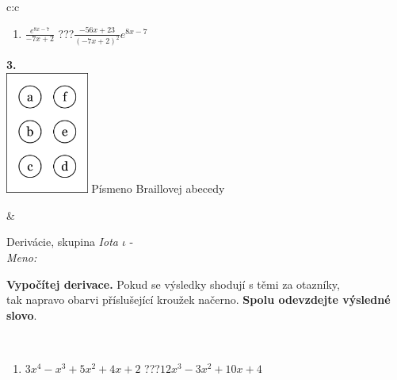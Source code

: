 \documentclass[10pt]{report}
\begin{document}
\begin{tabular}{c:c}
\begin{minipage}[c][104.5mm][t]{0.5\linewidth}
\begin{center}
\begin{minipage}{0.79\linewidth}
\begin{center}
\begin{varwidth}{\linewidth}
\begin{enumerate}
\item $\frac{e^{8x-7}}{-7x+2}$\quad \dotfill\; ???\;\dotfill \quad $\frac{-56x+23}{(-7x+2)^2}e^{8x-7}$
\end{enumerate}
\end{varwidth}
\end{center}
\end{minipage}
\begin{minipage}{0.20\linewidth}
\begin{center}
{\Huge\bfseries 3.} \\[2mm]
\includegraphics[height=40mm]{../images/braille.png}
{\small Písmeno Braillovej abecedy}
\end{center}
\end{minipage}
\end{center}
\end{minipage}
&
\begin{minipage}[c][104.5mm][t]{0.5\linewidth}
\begin{center}
\vspace{7mm}
{\huge Derivácie, skupina \textit{Iota $\iota$} -}\\[5mm]
\textit{Meno:}\phantom{xxxxxxxxxxxxxxxxxxxxxxxxxxxxxxxxxxxxxxxxxxxxxxxxxxxxxxxxxxxxxxxxx}\\[5mm]
\begin{minipage}{0.95\linewidth}
\begin{center}
\textbf{Vypočítej derivace.} Pokud se výsledky shodují s těmi za otazníky,\\tak napravo obarvi příslušející kroužek načerno. \textbf{Spolu odevzdejte výsledné slovo}.
\end{center}
\end{minipage}
\\[1mm]
\begin{minipage}{0.79\linewidth}
\begin{center}
\begin{varwidth}{\linewidth}
\begin{enumerate}
\normalsize
\item $3x^4-x^3+5x^2+4x+2$\quad \dotfill\; ???\;\dotfill \quad $12x^3-3x^2+10x+4$

\end{enumerate}
\end{varwidth}
\end{center}
\end{minipage}
\end{center}
\end{minipage}
\end{tabular}
\end{document}
